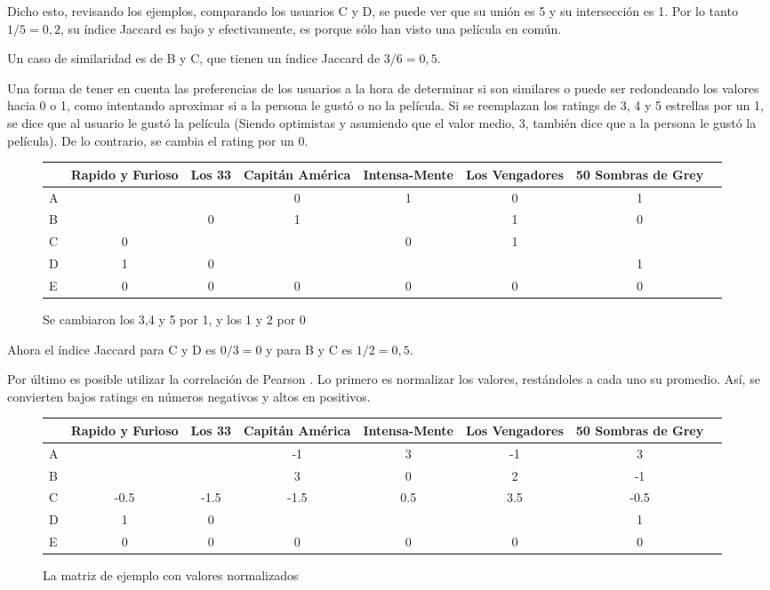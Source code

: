 Dicho esto, revisando los ejemplos, comparando los usuarios C y D, se puede ver que su unión es 5 y su intersección es 1. Por lo tanto $1 / 5 = 0,2$, su índice Jaccard es bajo y efectivamente, es porque sólo han visto una película en común. 

Un caso de similaridad es de B y C, que tienen un índice Jaccard de $3/6 = 0,5 $.

Una forma de tener en cuenta las preferencias de los usuarios a la hora de determinar si son similares o puede ser redondeando los valores hacia 0 o 1, como intentando aproximar si a la persona le gustó o no la película. Si se reemplazan los ratings de 3, 4 y 5 estrellas por un 1, se dice que al usuario le gustó la película (Siendo optimistas y asumiendo que el valor medio, 3, también dice que a la persona le gustó la película). De lo contrario, se cambia el rating por un 0.

\begin{figure}[h!]

\begin{tabular}{l*{6}{c}r}
                  & Rapido y Furioso & Los 33 & Capitán América & Intensa-Mente & Los Vengadores  & 50 Sombras de Grey  \\
\hline
A          &  &  & 0 & 1 & 0 & 1   \\
B          &  & 0 & 1 &  & 1  & 0   \\
C              & 0 &  &  & 0 & 1  &   \\
D       & 1 & 0 &  &  &   & 1   \\
E 		& 0 & 0 & 0 &  0&  0 & 0   \\

\end{tabular}
\caption{Se cambiaron los 3,4 y 5 por 1, y los 1 y 2 por 0}
\end{figure}

Ahora el índice Jaccard para C y D es $0 / 3 = 0$ y para B y C es $ 1 / 2 = 0,5$.

Por último es posible utilizar la correlación de Pearson \cite{Girgin,Victor}. Lo primero es normalizar los valores, restándoles a cada uno su promedio. Así, se convierten bajos ratings en números negativos y altos en positivos. 

\begin{figure}[h!]

\begin{tabular}{l*{6}{c}r}
                  & Rapido y Furioso & Los 33 & Capitán América & Intensa-Mente & Los Vengadores  & 50 Sombras de Grey  \\
\hline
A          &  &  & -1 & 3 & -1 & 3   \\
B          &   &  & 3 & 0 &  2 & -1   \\
C              & -0.5 & -1.5 &-1.5  & 0.5 & 3.5  &  -0.5  \\
D       & 1 & 0 &  &  &   & 1   \\
E 		& 0 & 0 & 0 &  0&  0 & 0   \\

\end{tabular}
\caption{La matriz de ejemplo con valores normalizados}
\end{figure} 

